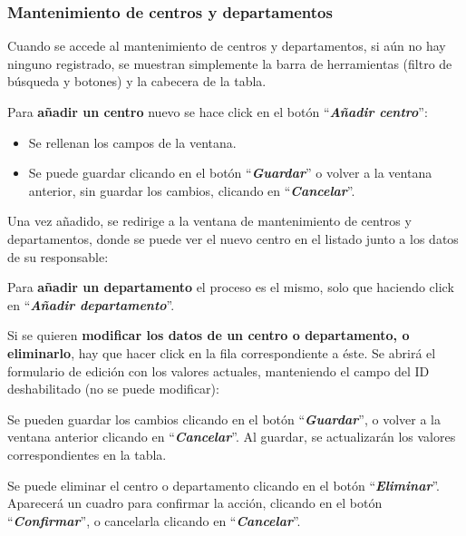 \subsubsection{Mantenimiento de centros y departamentos}
Cuando se accede al mantenimiento de centros y departamentos, si aún no hay ninguno registrado, se muestran simplemente la barra de herramientas (filtro de búsqueda y botones) y la cabecera de la tabla.


Para \textbf{añadir un centro} nuevo se hace click en el botón ``\textbf{\textit{Añadir centro}}'':
\begin{itemize}
    \item Se rellenan los campos de la ventana.
    \item Se puede guardar clicando en el botón ``\textbf{\textit{Guardar}}'' o volver a la ventana anterior, sin guardar los cambios, clicando en ``\textbf{\textit{Cancelar}}''.
\end{itemize}

Una vez añadido, se redirige a la ventana de mantenimiento de centros y departamentos, donde se puede ver el nuevo centro en el listado junto a los datos de su responsable:


Para \textbf{añadir un departamento} el proceso es el mismo, solo que haciendo click en ``\textbf{\textit{Añadir departamento}}''.

Si se quieren \textbf{modificar los datos de un centro o departamento, o eliminarlo}, hay que hacer click en la fila correspondiente a éste. Se abrirá el formulario de edición con los valores actuales, manteniendo el campo del ID deshabilitado (no se puede modificar):


Se pueden guardar los cambios clicando en el botón ``\textbf{\textit{Guardar}}'', o volver a la ventana anterior clicando en ``\textbf{\textit{Cancelar}}''. Al guardar, se actualizarán los valores correspondientes en la tabla.

Se puede eliminar el centro o departamento clicando en el botón ``\textbf{\textit{Eliminar}}''. Aparecerá un cuadro para confirmar la acción, clicando en el botón ``\textbf{\textit{Confirmar}}'', o cancelarla clicando en ``\textbf{\textit{Cancelar}}''.
        
